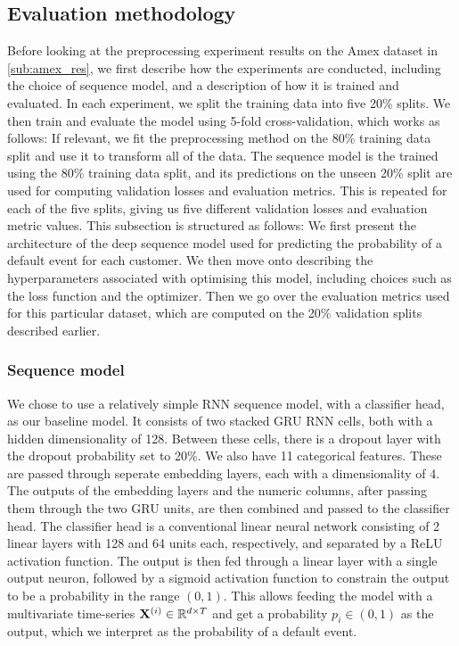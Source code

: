 \documentclass{statsmsc}
\begin{document}
{%

\subsection{Evaluation methodology}%
\label{sec:amex_meth}

Before looking at the preprocessing experiment results on the Amex dataset in \cref{sub:amex_res},
we first describe how the experiments are conducted, including the choice of sequence model,
and a description of how it is trained and evaluated. In each experiment, we split the training data into five
20\% splits. We then train and evaluate the model using 5-fold cross-validation, which works
as follows: If relevant, we fit the preprocessing method on the 80\% training data split and use
it to transform all of the data. The sequence model is the trained using the 80\% training data
split, and its predictions on the unseen  20\%  split are used for computing validation losses
and evaluation metrics.
This is repeated for each of the five splits, giving us five different validation losses and
evaluation metric values.
This subsection is structured as follows:
We first present the architecture of the deep sequence model used for predicting the probability of
a default event for each customer. We then move onto describing the hyperparameters associated with
optimising this model, including choices such as the loss function and the optimizer. Then we
go over the evaluation metrics used for this particular dataset, which are computed on the 20\%
validation splits described earlier.


\subsubsection{Sequence model}%
\label{ssub:Sequence model}

We chose to use a relatively simple \ac{RNN} sequence model, with a classifier head, as our
baseline model.
It consists of two stacked \ac{GRU} \ac{RNN} cells, both with a hidden dimensionality of 128.
Between these cells, there is a dropout layer with the dropout probability set to 20\%.
We also have 11 categorical features. These are
passed through seperate embedding layers, each with a dimensionality of 4. The outputs of the
embedding layers and the numeric columns, after passing them through the two \ac{GRU} units,
are then combined and passed to the classifier head. The classifier head is a conventional
linear neural network consisting of 2 linear layers with
128 and 64 units each, respectively, and separated by a \ac{ReLU} activation function.
The output is then fed through
a linear layer with a single output neuron, followed by a sigmoid activation function to constrain
the output to be a probability in the range $(0,1)$. This allows feeding the model with
a multivariate time-series $\mathbf{X}^{(i)} \in \mathbb{R}^{d \times T}$ and get a probability
$p_i \in (0,1)$ as the output, which we interpret as the probability of a default event.

}
\end{document}

